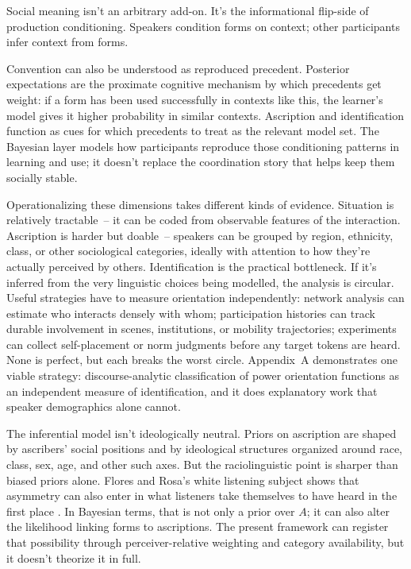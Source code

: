\documentclass[11pt,letterpaper]{article}
\begin{document}
Social meaning isn't an arbitrary add-on. It's the informational flip-side of production conditioning. Speakers condition forms on context; other participants infer context from forms.

Convention can also be understood as reproduced precedent. Posterior expectations are the proximate cognitive mechanism by which precedents get weight: if a form has been used successfully in contexts like this, the learner's model gives it higher probability in similar contexts. Ascription and identification function as cues for which precedents to treat as the relevant model set. The Bayesian layer models how participants reproduce those conditioning patterns in learning and use; it doesn't replace the coordination story that helps keep them socially stable.

Operationalizing these dimensions takes different kinds of evidence. Situation is relatively tractable~-- it can be coded from observable features of the interaction. Ascription is harder but doable~-- speakers can be grouped by region, ethnicity, class, or other sociological categories, ideally with attention to how they're actually perceived by others. Identification is the practical bottleneck. If it's inferred from the very linguistic choices being modelled, the analysis is circular. Useful strategies have to measure orientation independently: network analysis can estimate who interacts densely with whom; participation histories can track durable involvement in scenes, institutions, or mobility trajectories; experiments can collect self-placement or norm judgments before any target tokens are heard. None is perfect, but each breaks the worst circle. Appendix~A demonstrates one viable strategy:  discourse-analytic classification of power orientation functions as an independent measure of identification, and it does explanatory work that speaker demographics alone cannot.

The inferential model isn't ideologically neutral. Priors on ascription are shaped by ascribers' social positions and by ideological structures organized around race, class, sex, age, and other such axes. But the raciolinguistic point is sharper than biased priors alone. Flores and Rosa's white listening subject shows that asymmetry can also enter in what listeners take themselves to have heard in the first place \citep{FloresRosa2015,RosaFlores2017}. In Bayesian terms, that is not only a prior over $A$; it can also alter the likelihood linking forms to ascriptions. The present framework can register that possibility through perceiver-relative weighting and category availability, but it doesn't theorize it in full.
\end{document}
